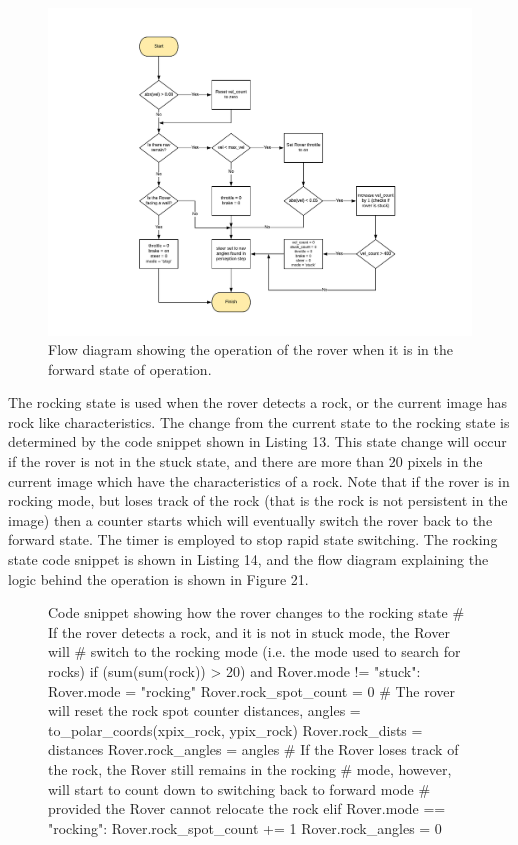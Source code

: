 \documentclass[a4paper]{article}
\begin{document}
\begin{figure}[h]
\hspace{-1.5cm}
\vspace{4cm}
\includegraphics[scale = 0.7]{forward_flow}
\vspace{-3cm}
\caption{Flow diagram showing the operation of the rover when it is in the forward state of operation.}
\end{figure}

\clearpage

The rocking state is used when the rover detects a rock, or the current image has rock like characteristics. The change from the current state to the rocking state is determined by the code snippet shown in Listing 13. This state change will occur if the rover is not in the stuck state, and there are more than 20 pixels in the current image which have the characteristics of a rock. Note that if the rover is in rocking mode, but loses track of the rock (that is the rock is not persistent in the image) then a counter starts which will eventually switch the rover back to the forward state. The timer is employed to stop rapid state switching. The rocking state code snippet is shown in Listing 14, and the flow diagram explaining the logic behind the operation is shown in Figure 21.\\

\begin{figure}[h]\scriptsize
\begin{sexylisting}{Code snippet showing how the rover changes to the rocking state}
# If the rover detects a rock, and it is not in stuck mode, the Rover will
# switch to the rocking mode (i.e. the mode used to search for rocks)
if (sum(sum(rock)) > 20) and Rover.mode != "stuck":
	Rover.mode = "rocking"
	Rover.rock_spot_count = 0 # The rover will reset the rock spot counter
	distances, angles = to_polar_coords(xpix_rock, ypix_rock)
	Rover.rock_dists = distances
	Rover.rock_angles = angles
# If the Rover loses track of the rock, the Rover still remains in the rocking
# mode, however, will start to count down to switching back to forward mode
# provided the Rover cannot relocate the rock
elif Rover.mode == "rocking":
	Rover.rock_spot_count += 1
	Rover.rock_angles = 0
\end{sexylisting}
\end{figure}
\end{document}
